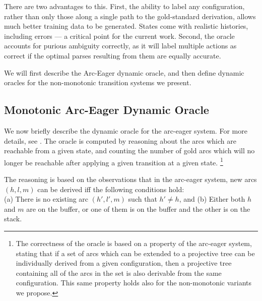 \documentclass[11pt,letterpaper]{article}
\newcommand{\note}[1]{\textcolor{red}{#1}}
\begin{document}
There are two advantages to this. First, the ability to label any configuration,
rather than only those along a single path to the gold-standard derivation,
allows much better training data to be generated. States come with realistic
histories, including errors --- a critical point for the current work. Second,
the oracle accounts for purious ambiguity correctly, as it will label multiple actions
as correct if the optimal parses resulting from them are equally accurate.

We will first describe the Arc-Eager dynamic oracle, and then define dynamic
oracles for the non-monotonic transition systems we present.

\subsection{Monotonic Arc-Eager Dynamic Oracle}

We now briefly describe the dynamic oracle for the arc-eager system. For more
details, see \citet{goldberg:12}. The oracle is computed by reasoning about the
arcs which are reachable from a given state, and counting the number of gold
arcs which will no longer be reachable after applying a given transition at a
given state.
\footnote{The correctness of
the oracle is based on a property of the arc-eager system, stating that if a
set of arcs which can be extended to a projective tree can be individually
derived from a given configuration, then a projective tree containing all of
the arcs in the set is also derivable from the same configuration. This same
property holds also for the non-monotonic variants we propose.}

The reasoning is based on the observations that in the arc-eager system, new
arcs $(h,l,m)$ can be derived iff the following conditions hold:\\
(a) There is no existing arc $(h',l',m)$ such that $h'\neq h$, and 
(b) Either both $h$ and $m$ are on the buffer, or one of them is on the buffer
and the other is on the stack.
\end{document}
